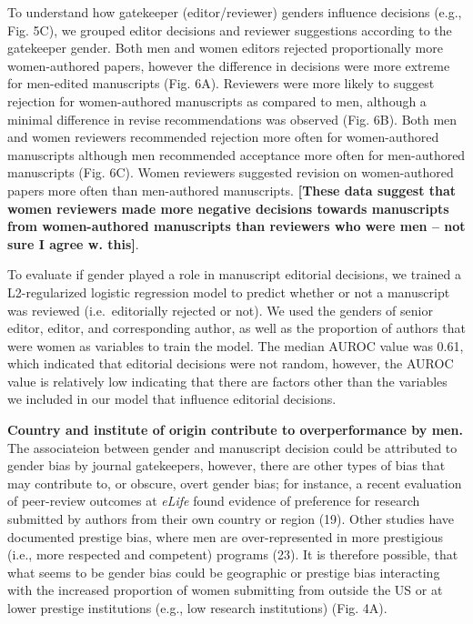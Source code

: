\documentclass[11pt,]{article}
\begin{document}
To understand how gatekeeper (editor/reviewer) genders influence
decisions (e.g., Fig. 5C), we grouped editor decisions and reviewer
suggestions according to the gatekeeper gender. Both men and women
editors rejected proportionally more women-authored papers, however the
difference in decisions were more extreme for men-edited manuscripts
(Fig. 6A). Reviewers were more likely to suggest rejection for
women-authored manuscripts as compared to men, although a minimal
difference in revise recommendations was observed (Fig. 6B). Both men
and women reviewers recommended rejection more often for women-authored
manuscripts although men recommended acceptance more often for
men-authored manuscripts (Fig. 6C). Women reviewers suggested revision
on women-authored papers more often than men-authored manuscripts.
\textbf{{[}These data suggest that women reviewers made more negative
decisions towards manuscripts from women-authored manuscripts than
reviewers who were men -- not sure I agree w. this{]}}.

To evaluate if gender played a role in manuscript editorial decisions,
we trained a L2-regularized logistic regression model to predict whether
or not a manuscript was reviewed (i.e.~editorially rejected or not). We
used the genders of senior editor, editor, and corresponding author, as
well as the proportion of authors that were women as variables to train
the model. The median AUROC value was 0.61, which indicated that
editorial decisions were not random, however, the AUROC value is
relatively low indicating that there are factors other than the
variables we included in our model that influence editorial decisions.

\textbf{Country and institute of origin contribute to overperformance by
men.} The associateion between gender and manuscript decision could be
attributed to gender bias by journal gatekeepers, however, there are
other types of bias that may contribute to, or obscure, overt gender
bias; for instance, a recent evaluation of peer-review outcomes at
\emph{eLife} found evidence of preference for research submitted by
authors from their own country or region (19). Other studies have
documented prestige bias, where men are over-represented in more
prestigious (i.e., more respected and competent) programs (23). It is
therefore possible, that what seems to be gender bias could be
geographic or prestige bias interacting with the increased proportion of
women submitting from outside the US or at lower prestige institutions
(e.g., low research institutions) (Fig. 4A).
\end{document}
